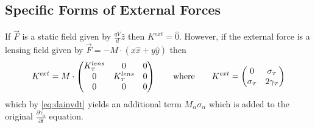 \subsection{Specific Forms of External Forces}
If $\vec{F}$ is a static field given by $\frac{qV}{d}\hat{z}$ then $K^{ext} = \hat{0}$. However, if the external force is a lensing field given by $\vec{F} = -M\cdot(x\hat{x}+y\hat{y})$ then 
\begin{equation}
  K^{ext} = M \cdot 
  \begin{pmatrix}
    K^{lens}_{{\scriptscriptstyle T}} & 0 & 0 \\
    0 & K^{lens}_{{\scriptscriptstyle T}} & 0 \\
    0 & 0 & 0
  \end{pmatrix}
  \qquad \text{where} \qquad
  K^{ext} = 
  \begin{pmatrix}
    0 & \sigma_{{\scriptscriptstyle T}} \\
    \sigma_{{\scriptscriptstyle T}} & 2 \gamma_{{\scriptscriptstyle T}}
  \end{pmatrix}
\end{equation}
which by \ref{eq:dainvdt} yields an additional term $M_{\alpha} \sigma_{\alpha}$ which is added to the original $\frac{\partial \gamma_{\alpha}}{\partial t}$ equation.

